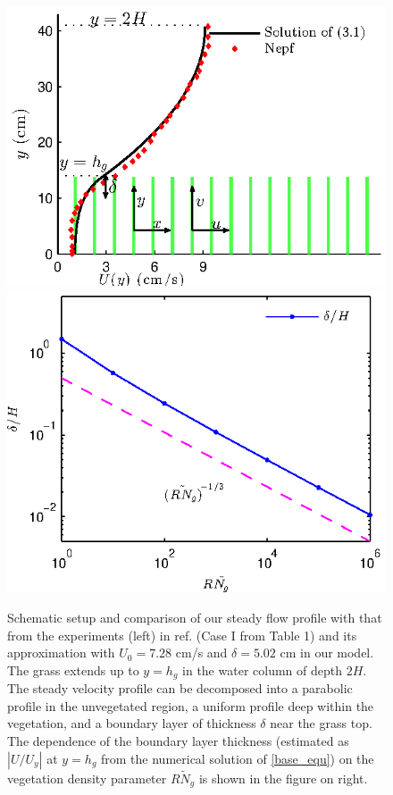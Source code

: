 \documentclass{jfm}
\newcommand{\hg}{h_g}
\renewcommand{\Rey}{{R}}
\newcommand{\Ndg}{\tilde{N}_g}
\newcommand{\ReyNdg}{{\Rey\Ndg}}
\begin{document}
\begin{figure}
\centerline{\includegraphics[scale=0.9]{fig1a} \includegraphics[scale=0.87]{fig1b}}
\caption{
Schematic setup and comparison of our steady flow profile with that from the experiments (left) in ref. \cite{Nepf04} (Case I from Table 1) %
 and its approximation with $U_0=7.28$ cm/s and $\delta = 5.02$ cm in our model. The grass extends up to $y=\hg$ in the water column of depth $2H$. 
The steady velocity profile can be decomposed into a parabolic profile in the unvegetated region, a uniform profile deep within the vegetation, and a boundary layer of thickness $\delta$ near the grass top. 
The dependence of the boundary layer thickness (estimated as $|U/U_y|$ at $y=\hg$ from the numerical solution of \eqref{base_equ}) on the vegetation density parameter $\ReyNdg$ is shown in the figure on right.
}
\label{basicflow}
\end{figure}
\end{document}
